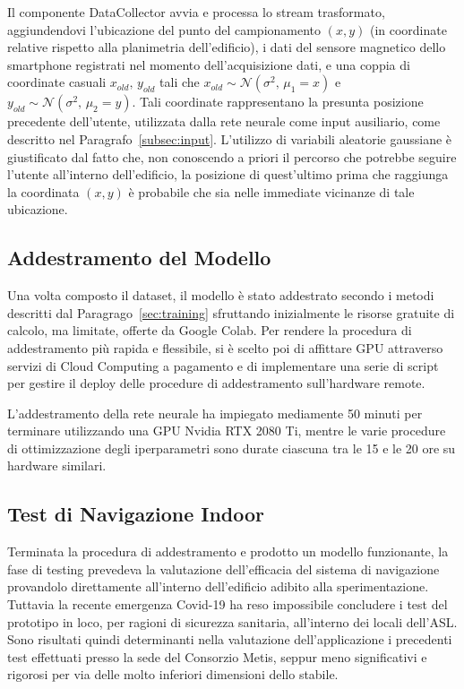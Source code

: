 Il componente DataCollector avvia e processa lo stream trasformato,
aggiundendovi l'ubicazione del punto del campionamento \((x, y)\) (in coordinate
relative rispetto alla planimetria dell'edificio), i dati del sensore magnetico
dello smartphone registrati nel momento dell'acquisizione dati, e una coppia di
coordinate casuali \(x_{old}, \, y_{old}\) tali che 
\( x_{old} \sim \mathcal{N}(\sigma^2, \, \mu_1 = x) \) e 
\( y_{old} \sim \mathcal{N}(\sigma^2, \, \mu_2 = y) \). Tali coordinate
rappresentano la presunta posizione precedente dell'utente, utilizzata dalla
rete neurale come input ausiliario, come descritto nel
Paragrafo~\ref{subsec:input}. L'utilizzo di variabili aleatorie gaussiane è
giustificato dal fatto che, non conoscendo a priori il percorso che potrebbe
seguire l'utente all'interno dell'edificio, la posizione di quest'ultimo prima
che raggiunga la coordinata \((x, y)\) è probabile che sia nelle immediate
vicinanze di tale ubicazione.

\subsection{Addestramento del Modello}
Una volta composto il dataset, il modello è stato addestrato secondo i metodi
descritti dal Paragrago~\ref{sec:training} sfruttando inizialmente le risorse
gratuite di calcolo, ma limitate, offerte da Google Colab. Per rendere la
procedura di addestramento più rapida e flessibile, si è scelto poi di
affittare GPU attraverso servizi di Cloud Computing a pagamento e di
implementare una serie di script per gestire il deploy delle procedure di
addestramento sull'hardware remote.

L'addestramento della rete neurale ha impiegato mediamente 50 minuti per
terminare utilizzando una GPU Nvidia RTX 2080 Ti, mentre le varie procedure di
ottimizzazione degli iperparametri sono durate ciascuna tra le 15 e le 20 ore
su hardware similari.
\subsection{Test di Navigazione Indoor}
Terminata la procedura di addestramento e prodotto un modello funzionante, la
fase di testing prevedeva la valutazione dell'efficacia del sistema di
navigazione provandolo direttamente all'interno dell'edificio adibito alla
sperimentazione. Tuttavia la recente emergenza Covid-19 ha reso impossibile
concludere i test del prototipo in loco, per ragioni di sicurezza sanitaria,
all'interno dei locali dell'ASL\@. Sono risultati quindi determinanti nella
valutazione dell'applicazione i precedenti test effettuati presso la sede del
Consorzio Metis, seppur meno significativi e rigorosi per via delle molto
inferiori dimensioni dello stabile.



